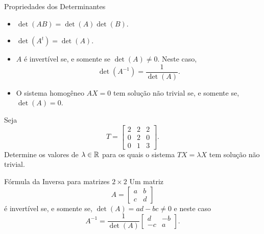 \begin{frame}[label=determinantes]{Propriedades dos Determinantes}

\begin{itemize}
\item $\det(AB)=\det(A)\det(B)$.

\item $\det(A^t)=\det(A)$.

\item $A$ é invertível se, e somente se $\det(A)\neq 0$. Neste caso, \[\det(A^{-1})=\frac{1}{\det(A)}.\]

\item O sistema homogêneo $AX=0$ tem solução não trivial se, e somente se, $\det(A)=0$.
\end{itemize}

\end{frame}

\begin{frame}[label=determinantes]

\begin{exe}Seja 
\[T=\begin{bmatrix}
2 & 2 & 2\\ 0 & 2 & 0 \\ 0 & 1 & 3
\end{bmatrix}.\]
Determine os valores de $\lambda \in \mathbb{R}$ para os quais o sistema $TX=\lambda X$ tem solução não trivial.
\end{exe}

\end{frame}


\begin{frame}[label=determinantes]


\begin{block}{Fórmula da Inversa para matrizes $2\times 2$}
Um matriz 
\[A=\begin{bmatrix}
a & b \\ c & d 
\end{bmatrix}\]
 é invertível se, e somente se, $\det(A)=ad-bc\neq 0$ e neste caso
\[A^{-1}=\frac{1}{\det(A)}\begin{bmatrix}
d & -b \\ -c & a 
\end{bmatrix}.\]

\end{block}

\end{frame}



